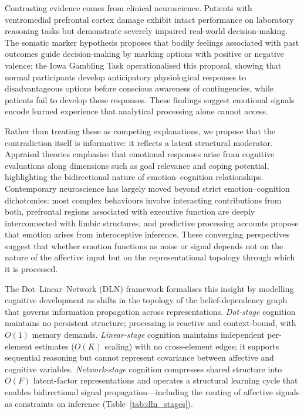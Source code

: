 \documentclass[11pt]{article}
\begin{document}
Contrasting evidence comes from clinical neuroscience. Patients with
ventromedial prefrontal cortex damage exhibit intact performance on
laboratory reasoning tasks but demonstrate severely impaired real-world
decision-making\cite{Damasio1994}. The somatic marker hypothesis proposes
that bodily feelings associated with past outcomes guide
decision-making by marking options with positive or negative valence;
the Iowa Gambling Task operationalised this proposal, showing that
normal participants develop anticipatory physiological responses to
disadvantageous options before conscious awareness of contingencies,
while patients fail to develop these responses\cite{Bechara1994}. These
findings suggest emotional signals encode learned experience that
analytical processing alone cannot access.

Rather than treating these as competing explanations, we propose that the
contradiction itself is informative: it reflects a latent structural
moderator. Appraisal theories emphasise that emotional responses arise
from cognitive evaluations along dimensions such as goal relevance and
coping potential\cite{Lazarus1991, Scherer2009}, highlighting the
bidirectional nature of emotion--cognition relationships\cite{Gross2015}.
Contemporary neuroscience has largely moved beyond strict
emotion--cognition dichotomies: most complex behaviours involve
interacting contributions from both\cite{Pessoa2008}, prefrontal regions
associated with executive function are deeply interconnected with limbic
structures\cite{Phelps2006}, and predictive processing accounts propose
that emotion arises from interoceptive inference\cite{Seth2013}. These
converging perspectives suggest that whether emotion functions as noise
or signal depends not on the nature of the affective input but on the
representational topology through which it is processed.

The Dot--Linear--Network (DLN) framework\cite{Wu2026} formalises this
insight by modelling cognitive development as shifts in the topology of
the belief-dependency graph that governs information propagation across
representations. \textit{Dot-stage} cognition maintains no persistent
structure; processing is reactive and context-bound, with $O(1)$ memory
demands. \textit{Linear-stage} cognition maintains independent
per-element estimates ($O(K)$ scaling) with no cross-element edges; it
supports sequential reasoning but cannot represent covariance between
affective and cognitive variables. \textit{Network-stage} cognition
compresses shared structure into $O(F)$ latent-factor representations
and operates a structural learning cycle that enables bidirectional
signal propagation---including the routing of affective signals as
constraints on inference (Table~\ref{tab:dln_stages}).
\end{document}
